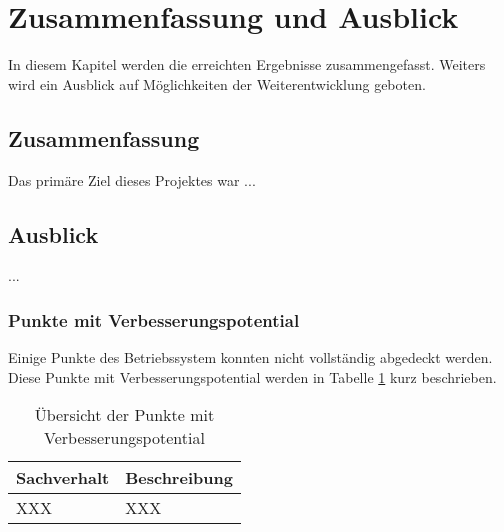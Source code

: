 \section{Zusammenfassung und Ausblick}
\label{summary}

In diesem Kapitel werden die erreichten Ergebnisse zusammengefasst. Weiters wird ein Ausblick auf Möglichkeiten der Weiterentwicklung geboten.

\subsection{Zusammenfassung}

Das primäre Ziel dieses Projektes war ...

\subsection{Ausblick}

...

\subsubsection{Punkte mit Verbesserungspotential}
Einige Punkte des Betriebssystem konnten nicht vollständig abgedeckt werden. Diese Punkte mit Verbesserungspotential werden in Tabelle \ref{table:points-to-improve} kurz beschrieben.

\begin{table}[H]
\begin{tabular}{p{5cm} | p{9cm}}
  \textbf{Sachverhalt} & \textbf{Beschreibung}
  \\ \hline
  XXX & XXX
  \\
 \end{tabular}
 \caption{Übersicht der Punkte mit Verbesserungspotential}
 \label{table:points-to-improve}
\end{table}